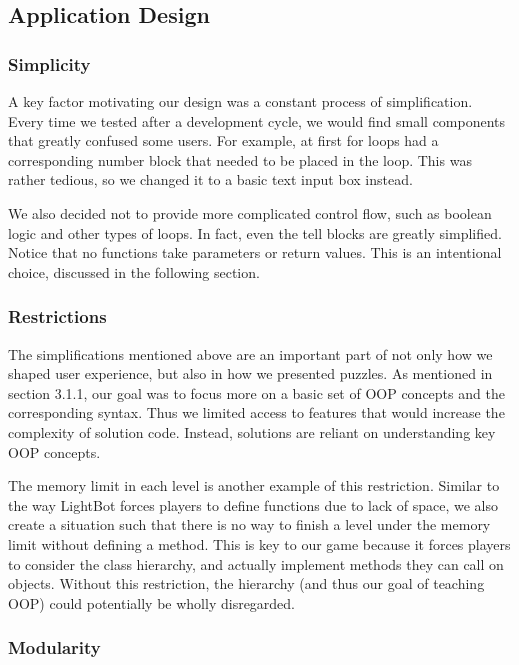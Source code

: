 \documentclass[12pt,notitlepage]{article}
\begin{document}
\subsection{Application Design}

\subsubsection{Simplicity}

A key factor motivating our design was a constant process of
simplification. Every time we tested after a development cycle, we would
find small components that greatly confused some users. For example,
at first for loops had a corresponding number block that needed to be
placed in the loop. This was rather tedious, so we changed it to a basic
text input box instead.

We also decided not to provide more complicated control flow, such as
boolean logic and other types of loops. In fact, even the tell blocks
are greatly simplified. Notice that no functions take parameters or
return values. This is an intentional choice, discussed in the following
section.

\subsubsection{Restrictions}

The simplifications mentioned above are an important part of not only
how we shaped user experience, but also in how we presented
puzzles. As mentioned in section 3.1.1, our goal was to focus more on
a basic set of OOP concepts and the corresponding syntax. Thus we
limited access to features that would increase the complexity of
solution code. Instead, solutions are reliant on understanding key OOP
concepts.

The memory limit in each level is another example of this
restriction. Similar to the way LightBot forces players to define
functions due to lack of space, we also create a situation such that
there is no way to finish a level under the memory limit without
defining a method. This is key to our game because it forces players
to consider the class hierarchy, and actually implement methods they
can call on objects. Without this restriction, the hierarchy (and thus
our goal of teaching OOP) could potentially be wholly disregarded.

\subsubsection{Modularity}
\end{document}
